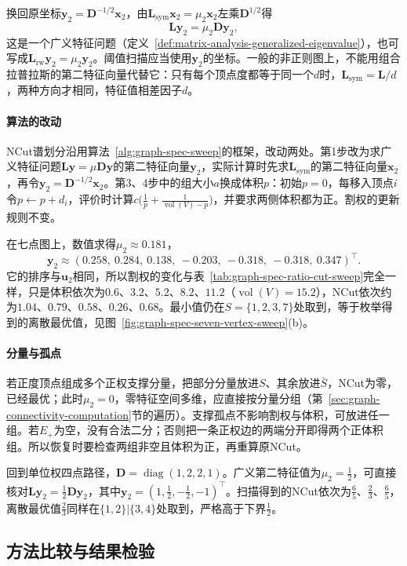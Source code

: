 换回原坐标$\bm y_2=\bm D^{-1/2}\bm x_2$，由$\bm L_{\mathrm{sym}}\bm x_2=\mu_2\bm x_2$左乘$\bm D^{1/2}$得
\[
 \bm L\bm y_2=\mu_2\bm D\bm y_2 ,
\]
这是一个广义特征问题（定义~\ref{def:matrix-analysis-generalized-eigenvalue}），也可写成$\bm L_{\mathrm{rw}}\bm y_2=\mu_2\bm y_2$。阈值扫描应当使用$\bm y_2$的坐标。一般的非正则图上，不能用组合拉普拉斯的第二特征向量代替它：只有每个顶点度都等于同一个$d$时，$\bm L_{\mathrm{sym}}=\bm L/d$，两种方向才相同，特征值相差因子$d$。

\paragraph{算法的改动}
NCut谱划分沿用算法~\ref{alg:graph-spec-sweep}的框架，改动两处。第1步改为求广义特征问题$\bm L\bm y=\mu\bm D\bm y$的第二特征向量$\bm y_2$，实际计算时先求$\bm L_{\mathrm{sym}}$的第二特征向量$\bm x_2$，再令$\bm y_2=\bm D^{-1/2}\bm x_2$。第3、4步中的组大小$a$换成体积$p$：初始$p=0$，每移入顶点$i$令$p\gets p+d_i$，评价时计算$c\bigl(\tfrac1p+\tfrac1{\operatorname{vol}(V)-p}\bigr)$，并要求两侧体积都为正。割权的更新规则不变。

在七点图上，数值求得$\mu_2\approx0.181$，
\[
 \bm y_2\approx(0.258,\ 0.284,\ 0.138,\ -0.203,\ -0.318,\ -0.318,\ 0.347)^{\top}.
\]
它的排序与$\bm u_2$相同，所以割权的变化与表~\ref{tab:graph-spec-ratio-cut-sweep}完全一样，只是体积依次为$0.6$、$3.2$、$5.2$、$8.2$、$11.2$（$\operatorname{vol}(V)=15.2$），NCut依次约为$1.04$、$0.79$、$0.58$、$0.26$、$0.68$。最小值仍在$S=\{1,2,3,7\}$处取到，等于枚举得到的离散最优值，见图~\ref{fig:graph-spec-seven-vertex-sweep}(b)。

\paragraph{分量与孤点}
若正度顶点组成多个正权支撑分量，把部分分量放进$S$、其余放进$\bar S$，NCut为零，已经最优；此时$\mu_2=0$，零特征空间多维，应直接按分量分组（第~\ref{sec:graph-connectivity-computation}节的遍历）。支撑孤点不影响割权与体积，可放进任一组。若$E_+$为空，没有合法二分；否则把一条正权边的两端分开即得两个正体积组。所以恢复时要检查两组非空且体积为正，再重算原NCut。

回到单位权四点路径，$\bm D=\operatorname{diag}(1,2,2,1)$。广义第二特征值为$\mu_2=\tfrac12$，可直接核对$\bm L\bm y_2=\tfrac12\bm D\bm y_2$，其中$\bm y_2=(1,\tfrac12,-\tfrac12,-1)^{\top}$。扫描得到的NCut依次为$\tfrac65$、$\tfrac23$、$\tfrac65$，离散最优值$\tfrac23$同样在$\{1,2\}|\{3,4\}$处取到，严格高于下界$\tfrac12$。

\subsection{方法比较与结果检验}
\label{sec:graph-spec-partition-comparison}


